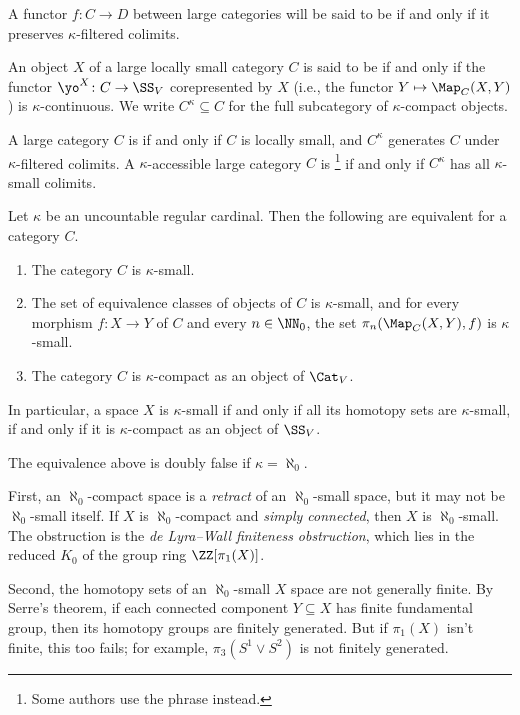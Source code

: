 \begin{definition}
	A functor $ f \colon C \to D $ between large categories
	will be said to be 
	if and only if it preserves $ \kappa $-filtered colimits.
	
	An object $ X $ of a large locally small category $ C $
	is said to be  if and only if
	the functor $ \yo^X \colon C \to \SS_V$ corepresented by $ X $
	(i.e., the functor $ Y \mapsto \Map_C(X,Y) $)
	is $ \kappa $-continuous.
	We write $ C^{\kappa} \subseteq C $
	for the full subcategory of $ \kappa $-compact objects.

	A large category $C$ is  if and only if
	$ C $ is locally small, and
	$ C^{\kappa} $ generates $ C $ under $ \kappa $-filtered colimits.
	A $ \kappa $-accessible large category $C$ is %
	\footnote{Some authors use the phrase  instead.}
	if and only if $ C^{\kappa} $ has all $ \kappa $-small colimits.
\end{definition}

\begin{eg}
	Let $ \kappa $ be an uncountable regular cardinal.
	Then the following are equivalent for a category $ C $.
	\begin{enumerate}
		\item The category $ C $ is $ \kappa $-small.
		\item The set of equivalence classes of objects of $C$ is $ \kappa $-small,
			and for every morphism $ f \colon X \to Y $ of $ C $ and every $ n \in \NN_0$,
			the set $ \pi_n(\Map_C(X,Y),f) $ is $ \kappa $-small.
		\item The category $ C $ is $ \kappa $-compact as an object of $ \Cat_V $.
	\end{enumerate}
	In particular, a space $ X $ is $ \kappa $-small if and only if
	all its homotopy sets are $ \kappa $-small, if and only if
	it is $ \kappa $-compact as an object of $ \SS_V $.
\end{eg}

\begin{eg}
	The equivalence above is doubly false if $ \kappa = \aleph_0 $.

	First, an $ \aleph_0 $-compact space is a \emph{retract} of
	an $ \aleph_0 $-small space, but 
	it may not be $ \aleph_0 $-small itself.
	If $ X $ is $ \aleph_0 $-compact and \emph{simply connected},
	then $ X $ is $ \aleph_0 $-small.
	The obstruction is the \emph{de Lyra--Wall finiteness obstruction},
	which lies in the reduced $ K_0 $ of the group ring $ \ZZ[\pi_1(X)] $.

	Second, the homotopy sets of an $ \aleph_0 $-small $ X $ space
	are not generally finite.
	By Serre's theorem, if each connected component $ Y \subseteq X $
	has finite fundamental group, then
	its homotopy groups are finitely generated.
	But if $ \pi_1(X) $ isn't finite,
	this too fails;
	for example, $ \pi_3(S^1 \vee S^2) $ is not finitely generated.
\end{eg}

